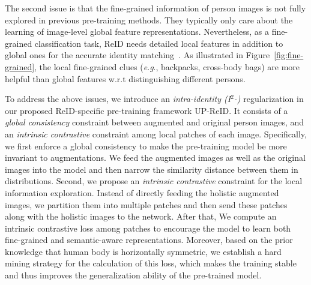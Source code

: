 \documentclass[10pt,twocolumn,letterpaper]{article}
\newcommand{\egno}{\textit{e}.\textit{g}.} %
\begin{document}

The second issue is that the fine-grained information of person images is not fully explored in previous pre-training methods. They typically only care about the learning of image-level global feature representations. Nevertheless, as a fine-grained classification task, ReID needs detailed local features in addition to global ones for the accurate identity matching~\cite{wang2018learning,yang2019patch,sun2018beyond}. As illustrated in Figure~\ref{fig:fine-grained}, the local fine-grained clues (\egno, backpacks, cross-body bags) are more helpful than global features w.r.t distinguishing different persons.


To address the above issues, we introduce an \emph{intra-identity (I$^2$-)} regularization in our proposed ReID-specific pre-training framework UP-ReID. It consists of a \emph{global consistency} constraint between augmented and original person images, and an \emph{intrinsic contrastive} constraint among local patches of each image.
Specifically, we first enforce a global {consistency} to make the pre-training model be more invariant to augmentations. We feed the augmented images as well as the original images into the model and then narrow the similarity distance between them in distributions.
Second, we propose an \emph{intrinsic contrastive} constraint for the local information exploration. Instead of directly feeding the holistic augmented images, we partition them into multiple patches and then send these patches along with the holistic images to the network. After that, We compute an intrinsic contrastive loss among patches to encourage the model to learn both fine-grained and semantic-aware representations. Moreover, based on the prior knowledge that human body is horizontally symmetric, we establish a hard mining strategy for the calculation of this loss, which makes the training stable and thus improves the generalization ability of the pre-trained model.
\end{document}
